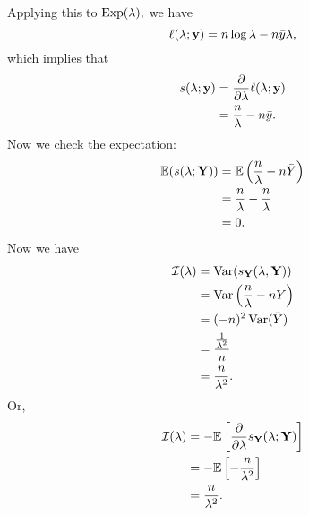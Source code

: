 \begin{eg}
Applying this to $\operatorname*{Exp}(\lambda),$ we have
$$
\ell(\lambda;\mathbf y)=n\log\lambda-n\bar y \lambda,
$$
which implies that
\begin{align*}
s(\lambda;\mathbf y)&=\frac{\partial}{\partial\lambda}\ell(\lambda;\mathbf y) \\
&=\frac{n}{\lambda}-n\bar y.
\end{align*}
Now we check the expectation:
\begin{align*}
    \mathbb E(s(\lambda;\mathbf Y))&=\mathbb E\left(\frac{n}{\lambda}-n\bar Y\right)\\
    &=\frac{n}{\lambda}-\frac{n}{\lambda} \\
    &=0.
\end{align*}
Now we have
\begin{align*}
    \mathcal I(\lambda)&=\operatorname*{Var}(s_\mathbf Y(\lambda,\mathbf Y))\\
    &=\operatorname*{Var}\left(\frac{n}{\lambda}-n\bar Y\right)\\
    &=(-n)^2\operatorname*{Var}(\bar Y) \\
    &=\frac{\frac{1}{\lambda^2}}{n} \\
    &=\frac{n}{\lambda^2}.
\end{align*}
Or,
\begin{align*}
    \mathcal I(\lambda)&=-\mathbb E\left[\frac{\partial}{\partial\lambda}s_\mathbf Y(\lambda;\mathbf Y)\right]\\
    &=-\mathbb E\left[-\frac{n}{\lambda^2}\right] \\
    &=\frac{n}{\lambda^2}.
\end{align*}
\end{eg}
